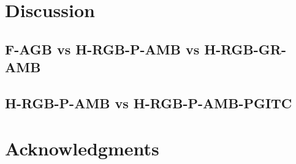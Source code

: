 \documentclass[10pt,letterpaper]{article}
\begin{document}
%


\section{Discussion}

	\subsection{F-AGB vs H-RGB-P-AMB vs H-RGB-GR-AMB}
	
	
	
	\subsection{H-RGB-P-AMB vs H-RGB-P-AMB-PGITC}
	
	
	
%



\section{Acknowledgments}

%






\setlength{\bibleftmargin}{.125in}
\setlength{\bibindent}{-\bibleftmargin}


\end{document}
